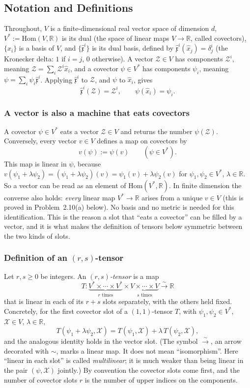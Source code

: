 \documentclass[11pt]{article}
\newcommand{\dual}{V^{*}}
\newcommand{\linto}{\overset{\sim}{\longrightarrow}}
\begin{document}
\subsection*{Notation and Definitions}

Throughout, $V$ is a finite-dimensional real vector space of dimension $d$, $\dual:=\mathrm{Hom}(V,\mathbb R)$ is its dual (the space of linear maps $V\to\mathbb R$, called covectors), $\{\hat x_i\}$ is a basis of $V$, and $\{\hat{\mathfrak x}^i\}$ is its dual basis, defined by $\hat{\mathfrak x}^i(\hat x_j)=\delta^i_j$ (the Kronecker delta: $1$ if $i=j$, $0$ otherwise). A vector $\mathcal Z\in V$ has components $\mathcal Z^i$, meaning $\mathcal Z=\sum_i\mathcal Z^i\hat x_i$, and a covector $\psi\in\dual$ has components $\psi_i$, meaning $\psi=\sum_i\psi_i\hat{\mathfrak x}^i$. Applying $\hat{\mathfrak x}^i$ to $\mathcal Z$, and $\psi$ to $\hat x_i$, gives
\[
\hat{\mathfrak x}^i(\mathcal Z)=\mathcal Z^i,\qquad \psi(\hat x_i)=\psi_i.
\]

\subsubsection*{A vector is also a machine that eats covectors}
A covector $\psi\in\dual$ eats a vector $\mathcal Z\in V$ and returns the number $\psi(\mathcal Z)$. Conversely, every vector $v\in V$ defines a map on covectors by
\[
v(\psi):=\psi(v)\qquad(\psi\in\dual).
\]
This map is linear in $\psi$, because $v(\psi_1+\lambda\psi_2)=(\psi_1+\lambda\psi_2)(v)=\psi_1(v)+\lambda\psi_2(v)$ for $\psi_1,\psi_2\in\dual$, $\lambda\in\mathbb R$. So a vector can be read as an element of $\mathrm{Hom}(\dual,\mathbb R)$. In finite dimension the converse also holds: \emph{every} linear map $\dual\to\mathbb R$ arises from a unique $v\in V$ (this is proved in Problem~2.10(a) below). No basis and no metric is needed for this identification. This is the reason a slot that ``eats a covector'' can be filled by a vector, and it is what makes the definition of tensors below symmetric between the two kinds of slots.

\subsubsection*{Definition of an $(r,s)$-tensor}
Let $r,s\ge0$ be integers. An \emph{$(r,s)$-tensor} is a map
\[
T:\underbrace{\dual\times\cdots\times\dual}_{r\text{ times}}\times\underbrace{V\times\cdots\times V}_{s\text{ times}}\linto\mathbb R
\]
that is linear in each of its $r+s$ slots separately, with the others held fixed. Concretely, for the first covector slot of a $(1,1)$-tensor $T$, with $\psi_1,\psi_2\in\dual$, $\mathcal X\in V$, $\lambda\in\mathbb R$,
\[
T(\psi_1+\lambda\psi_2,\mathcal X)=T(\psi_1,\mathcal X)+\lambda\,T(\psi_2,\mathcal X),
\]
and the analogous identity holds in the vector slot. (The symbol $\linto$, an arrow decorated with $\sim$, marks a linear map. It does not mean ``isomorphism''. Here ``linear in each slot'' is called \emph{multilinear}; it is much weaker than being linear in the pair $(\psi,\mathcal X)$ jointly.) By convention the covector slots come first, and the number of covector slots $r$ is the number of upper indices on the components.
\end{document}
